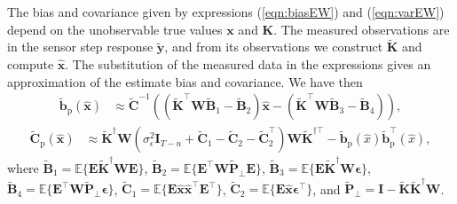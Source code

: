 The bias and covariance given by expressions (\ref{eqn:biasEW}) and (\ref{eqn:varEW}) depend on the unobservable true values $\mathbf{x}$ and $\mathbf{K}$.
The measured observations are in the sensor step response $\widetilde{\mathbf{y}}$, and from its observations we construct $\widetilde{\mathbf{K}}$ and compute $\widehat{\mathbf{x}}$.
The substitution of the measured data in the expressions gives an approximation of the estimate bias and covariance. 
We have then
\begin{equation} \begin{aligned} \widetilde{\mathbf{b}}_{\mathrm{p}} \left( \widehat{\mathbf{x}} \right) & \approx \widetilde{\mathbf{C}}^{-1} \left(  \left( \widetilde{\mathbf{K}}^\top \mathbf{W} \widetilde{\mathbf{B}}_1 - \widetilde{\mathbf{B}}_2 \right) \widehat{\mathbf{x}} - \left( \widetilde{\mathbf{K}}^\top \mathbf{W} \widetilde{\mathbf{B}}_3 - \widetilde{\mathbf{B}}_4 \right) \right), \end{aligned} \label{eqn:biasSTW} \end{equation}
  \begin{equation} \begin{aligned} \widetilde{\mathbf{C}}_{\mathrm{p}} \left( \widehat{\mathbf{x}} \right) & \approx \widetilde{\mathbf{K}}^\dagger \mathbf{W} \left( \sigma_{\epsilon}^2 \mathbf{I}_{T-n} + \widetilde{\mathbf{C}}_1 - \widetilde{\mathbf{C}}_2 - \widetilde{\mathbf{C}}_2^\top \right) \mathbf{W} \widetilde{\mathbf{K}}^{\dagger \top} - \widetilde{\mathbf{b}}_{\mathrm{p}} \left( \widehat{x} \right) \widetilde{\mathbf{b}}_{\mathrm{p}}^\top \left( \widehat{x} \right), \end{aligned} \label{eqn:varSTW} \end{equation}
  where $\widetilde{\mathbf{B}}_1 = \mathbb{E} \Big\{ \mathbf{E} \widetilde{\mathbf{K}}^\dagger \mathbf{W} \mathbf{E} \Big\}$, $\widetilde{\mathbf{B}}_2 = \mathbb{E} \Big\{ \mathbf{E}^\top \mathbf{W} \widetilde{\mathbf{P}}_\perp \mathbf{E} \Big\}$, $\widetilde{\mathbf{B}}_3 = \mathbb{E} \Big\{ \mathbf{E} \widetilde{\mathbf{K}}^\dagger \mathbf{W} \bm{\epsilon} \Big\}$, $\widetilde{\mathbf{B}}_4 = \mathbb{E} \Big\{ \mathbf{E}^\top \mathbf{W} \widetilde{\mathbf{P}}_\perp \bm{\epsilon} \Big\}$, $\widetilde{\mathbf{C}}_1 = \mathbb{E} \Big\{ \mathbf{E} \widehat{\mathbf{x}} \widehat{\mathbf{x}}^\top \mathbf{E}^\top \Big\}$, $\widetilde{\mathbf{C}}_2 = \mathbb{E} \Big\{ \mathbf{E} \widehat{\mathbf{x}} \bm{\epsilon}^\top \Big\}$, and $\widetilde{\mathbf{P}}_\perp = \mathbf{I} - \widetilde{\mathbf{K}} \widetilde{\mathbf{K}}^\dagger \mathbf{W}$. 

